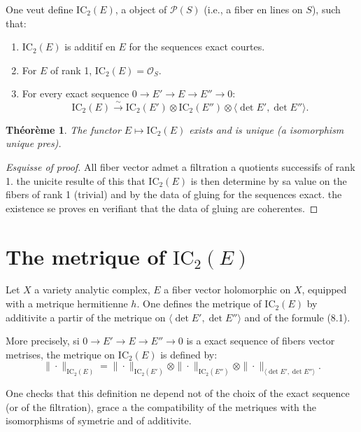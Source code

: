 \documentclass[11pt,a4paper]{article}
\theoremstyle{plain}
\newtheorem{theorem}{Th\'eor\`eme}[section]
\theoremstyle{definition}
\newcommand{\IC}{\mathrm{IC}}
\newcommand{\cO}{\mathcal{O}}
\newcommand{\cP}{\mathcal{P}}
\begin{document}
One veut define $\IC_2(E)$, a object of $\cP(S)$ (i.e., a fiber en lines on $S$), such that:
\begin{enumerate}
\item[(i)] $\IC_2(E)$ is additif en $E$ for the sequences exact courtes.
\item[(ii)] For $E$ of rank 1, $\IC_2(E) = \cO_S$.
\item[(iii)] For every exact sequence $0 \to E' \to E \to E'' \to 0$:
\begin{equation}
\IC_2(E) \xrightarrow{\sim} \IC_2(E') \otimes \IC_2(E'') \otimes \langle \det E', \det E'' \rangle.
\end{equation}
\end{enumerate}

\begin{theorem}
The functor $E \mapsto \IC_2(E)$ exists and is unique (a isomorphism unique pres).
\end{theorem}

\begin{proof}[Esquisse of proof]
All fiber vector admet a filtration a quotients successifs of rank 1. the unicite resulte of this that $\IC_2(E)$ is then determine by sa value on the fibers of rank 1 (trivial) and by the data of gluing for the sequences exact. the existence se proves en verifiant that the data of gluing are coherentes.
\end{proof}

\section{The metrique of $\IC_2(E)$}

Let $X$ a variety analytic complex, $E$ a fiber vector holomorphic on $X$, equipped with a metrique hermitienne $h$. One defines the metrique of $\IC_2(E)$ by additivite a partir of the metrique on $\langle \det E', \det E'' \rangle$ and of the formule (8.1).

More precisely, si $0 \to E' \to E \to E'' \to 0$ is a exact sequence of fibers vector metrises, the metrique on $\IC_2(E)$ is defined by:
\begin{equation}
\|\cdot\|_{\IC_2(E)} = \|\cdot\|_{\IC_2(E')} \otimes \|\cdot\|_{\IC_2(E'')} \otimes \|\cdot\|_{\langle \det E', \det E'' \rangle}.
\end{equation}

One checks that this definition ne depend not of the choix of the exact sequence (or of the filtration), grace a the compatibility of the metriques with the isomorphisms of symetrie and of additivite.
\end{document}
